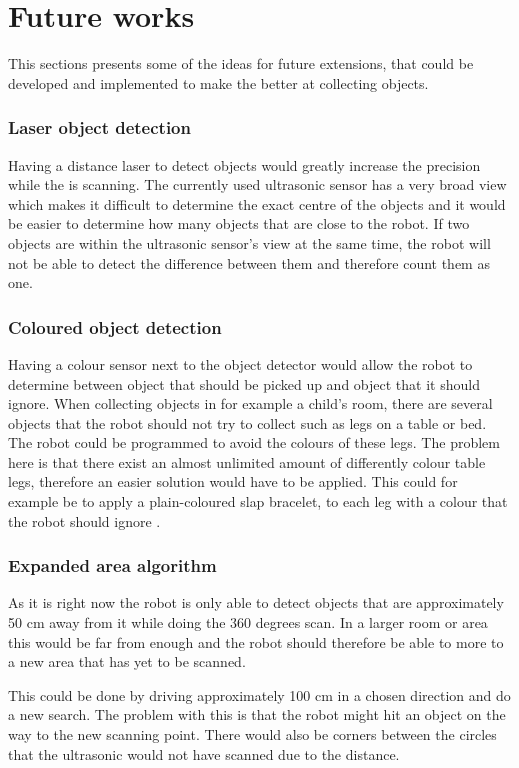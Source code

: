 \section{Future works} \label{sec:future_works}
This sections presents some of the ideas for future extensions, that could be developed and implemented to make the \projname{} better at collecting objects. 

\subsubsection{Laser object detection}
Having a distance laser to detect objects would greatly increase the precision while the \projname{} is scanning. The currently used ultrasonic sensor has a very broad view which makes it difficult to determine the exact centre of the objects and it would be easier to determine how many objects that are close to the robot. If two objects are within the ultrasonic sensor's view at the same time, the robot will not be able to detect the difference between them and therefore count them as one.

\subsubsection{Coloured object detection}
Having a colour sensor next to the object detector would allow the robot to determine between object that should be picked up and object that it should ignore. When collecting objects in for example a child's room, there are several objects that the robot should not try to collect such as legs on a table or bed. The robot could be programmed to avoid the colours of these legs. The problem here is that there exist an almost unlimited amount of differently colour table legs, therefore an easier solution would have to be applied. This could for example be to apply a plain-coloured slap bracelet, to each leg with a colour that the robot should ignore \citep{slap_bracelet}.

\subsubsection{Expanded area algorithm}
As it is right now the robot is only able to detect objects that are approximately 50 cm away from it while doing the 360 degrees scan. In a larger room or area this would be far from enough and the robot should therefore be able to more to a new area that has yet to be scanned.

This could be done by driving approximately 100 cm in a chosen direction and do a new search. The problem with this is that the robot might hit an object on the way to the new scanning point. There would also be corners between the circles that the ultrasonic would not have scanned due to the distance.


